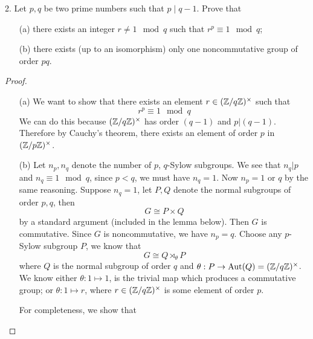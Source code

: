 \begin{prob}[F2019-Q2]
    2. Let \( p, q \) be two prime numbers such that \( p \mid q - 1 \). Prove that  
    \begin{itemize}
    \item[(a)]there exists an integer \( r \neq 1 \mod q \) such that \( r^p \equiv 1 \mod q \);
    \item[(b)] there exists (up to an isomorphism) only one noncommutative group of order \( pq \).
    \end{itemize}
\end{prob}
\begin{proof}
    \begin{itemize}
        \item[(a)] We want to show that there exists an element $r\in(\mathbb{Z}/q\mathbb{Z})^\times$ such that 
        \begin{equation*}
            r^p\equiv 1\mod q
        \end{equation*}
        We can do this because $(\mathbb{Z}/q\mathbb{Z})^\times$ has order $(q-1)$ and $p\vert (q-1)$. Therefore by Cauchy's theorem, there exists an element of order $p$ in $(\mathbb{Z}/p\mathbb{Z})^\times$.
        \item[(b)] Let $n_p,n_q$ denote the number of $p$, $q$-Sylow subgroups. We see that $n_q\vert p$ and $n_q\equiv 1\mod q$, since $p<q$, we must have $n_q=1$. Now $n_p=1$ or $q$ by the same reasoning. Suppose $n_q=1$, let $P,Q$ denote the normal subgroups of order $p,q$, then
        \begin{equation*}
            G\cong P\times Q
        \end{equation*}
        by a standard argument (included in the lemma below). Then $G$ is commutative. Since $G$ is noncommutative, we have $n_p=q$. Choose any $p$-Sylow subgroup $P$, we know that 
        \begin{equation*}
            G\cong Q\rtimes_\theta P
        \end{equation*} 
        where $Q$ is the normal subgroup of order $q$ and $\theta: P\to\text{Aut}(Q)=(\mathbb{Z}/q\mathbb{Z})^\times$. We know either $\theta: 1\mapsto 1$, is the trivial map which produces  a commutative group; or $\theta: 1\mapsto r$, where $r\in(\mathbb{Z}/q\mathbb{Z})^\times$ is some element of order $p$. 
        

        \begin{warn}
            For completeness, we show that 
        \end{warn}
        
    \end{itemize}
\end{proof}




